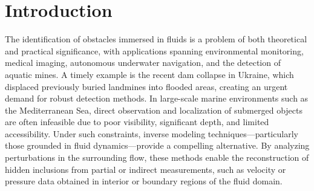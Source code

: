 \documentclass[a4paper,12pt,reqno,natbib]{amsart}
\begin{document}
\maketitle
\pagestyle{myheadings} \thispagestyle{plain} \markboth{}{}
\tableofcontents 













\section{Introduction}

The identification of obstacles immersed in fluids is a problem of both theoretical and practical significance, with applications spanning environmental monitoring, medical imaging, autonomous underwater navigation, and the detection of aquatic mines. A timely example is the recent dam collapse in Ukraine, which displaced previously buried landmines into flooded areas, creating an urgent demand for robust detection methods. In large-scale marine environments such as the Mediterranean Sea, direct observation and localization of submerged objects are often infeasible due to poor visibility, significant depth, and limited accessibility. Under such constraints, inverse modeling techniques—particularly those grounded in fluid dynamics—provide a compelling alternative. By analyzing perturbations in the surrounding flow, these methods enable the reconstruction of hidden inclusions from partial or indirect measurements, such as velocity or pressure data obtained in interior or boundary regions of the fluid domain.
\end{document}
